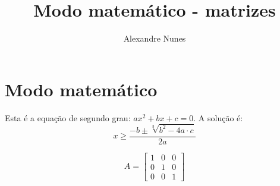 \documentclass{article}
\begin{document}
	
	\title{\textbf{{\Huge Modo matemático - matrizes}}} %
	\author{Alexandre Nunes} %
	\date{} %
	\maketitle %
	\thispagestyle{empty} %
	\newpage
	
	\setcounter{page}{1} %
	\tableofcontents %
	\newpage
	
	\listoffigures %
	\newpage
	
	\listoftables %
	\newpage

	\setcounter{page}{1} %
	
	\section{Modo matemático}

    Esta é a equação de segundo grau: $ ax^2 +bx +c=0 $. A solução é:
    \begin{equation*}
    	x \geq \frac{-b \pm \sqrt[3]{b^2 -4a\cdot c}}{2a}
    \end{equation*}
    
    \begin{equation*}
    	A = \begin{bmatrix}
    	1 & 0 & 0 \\ 
    	0 & 1 & 0 \\ 
    	0 & 0 & 1
    	\end{bmatrix} 
    \end{equation*}
    
	
	
	
\end{document}
